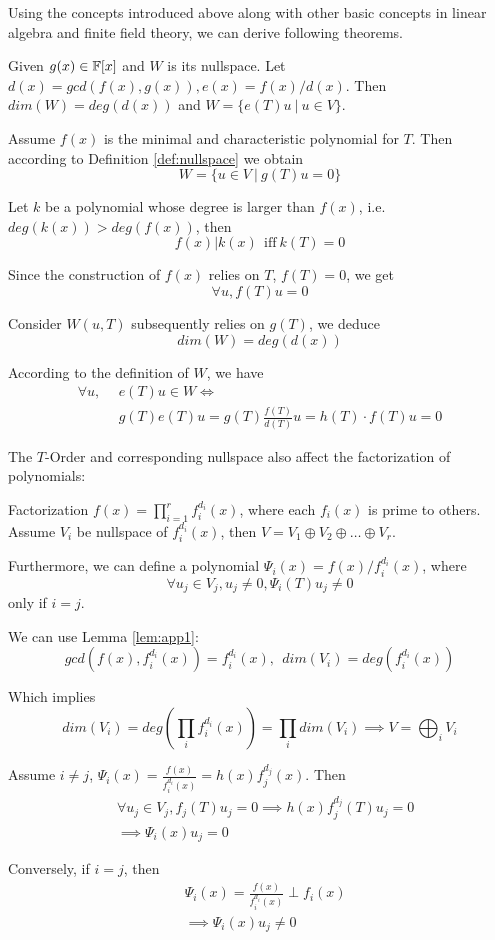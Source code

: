 Using the concepts introduced above along with other basic concepts in linear algebra and finite field theory,
we can derive following theorems.

\begin{Lemma}
\label{lem:app1}
Given $g(x) \in {\mathbb{F}}[x]$ and $W$ is its nullspace. Let $d(x) = gcd(f(x),g(x)), e(x) = f(x)/d(x)$. 
Then $dim(W) = deg(d(x))$ and $W = \{e(T)u~|~u \in V\}$.
\end{Lemma}
\begin{Proof}
Assume $f(x)$ is the minimal and characteristic polynomial for $T$. Then according to Definition \ref{def:nullspace}
we obtain 
$$W = \{u\in V~|~g(T)u = 0\}$$

Let $k$ be a polynomial whose degree is larger than $f(x)$, i.e. $deg(k(x))>deg(f(x))$, then
$$f(x)|k(x)~~\text{iff}~k(T)=0$$

Since the construction of $f(x)$ relies on $T$, $f(T) = 0$, we get
$$\forall u, f(T)u = 0$$

Consider $W(u,T)$ subsequently relies on $g(T)$, we deduce 
$$dim(W) = deg(d(x))$$

According to the definition of $W$, we have
\begin{align*}
\forall u,~~& e(T)u \in W \Longleftrightarrow \\
& g(T)e(T)u = g(T)\frac{f(T)}{d(T)} u = h(T)\cdot f(T) u = 0
\end{align*}
\end{Proof}

The $T$-Order and corresponding nullspace also affect the factorization of polynomials:
\begin{Lemma}[Factorization of $f(x)$]
Factorization $f(x) = \prod_{i=1}^{r} f_{i}^{d_i} (x)$, where each $f_i(x)$ is prime to others. 
Assume $V_i$ be nullspace of $f_{i}^{d_i} (x)$, then $V = V_1\oplus V_2 \oplus \dots\oplus V_r$.

Furthermore, we can define a polynomial $\Psi_i(x) = f(x)/f_{i}^{d_i} (x)$, where 
$$\forall u_j \in V_j, u_j \neq 0, \Psi_i(T)u_j \neq 0$$
only if $i = j$.
\end{Lemma}
\begin{Proof}
We can use Lemma \ref{lem:app1}:
$$gcd(f(x),f_{i}^{d_i} (x)) = f_{i}^{d_i} (x),~~dim(V_i) = deg(f_{i}^{d_i} (x))$$

Which implies 
$$dim(V_i) = deg\left(\prod_i f_{i}^{d_i} (x)\right) = \prod_i dim(V_i) \implies V = \bigoplus_i V_i$$

Assume $i\neq j$, $\Psi_i(x) = \frac{f(x)}{f_{i}^{d_i} (x)} = h(x)f_{j}^{d_j} (x)$. Then
\begin{align*}
&\forall u_j\in V_j, f_j(T)u_j = 0 \implies h(x)f_{j}^{d_j} (T)u_j = 0 \\
& \implies \Psi_i(x)u_j = 0
\end{align*}

Conversely, if $i=j$, then
\begin{align*}
& \Psi_i(x) = \frac{f(x)}{f_{i}^{d_i} (x)} \perp f_i(x) \\
& \implies \Psi_i(x)u_j \neq 0
\end{align*}
\end{Proof}

